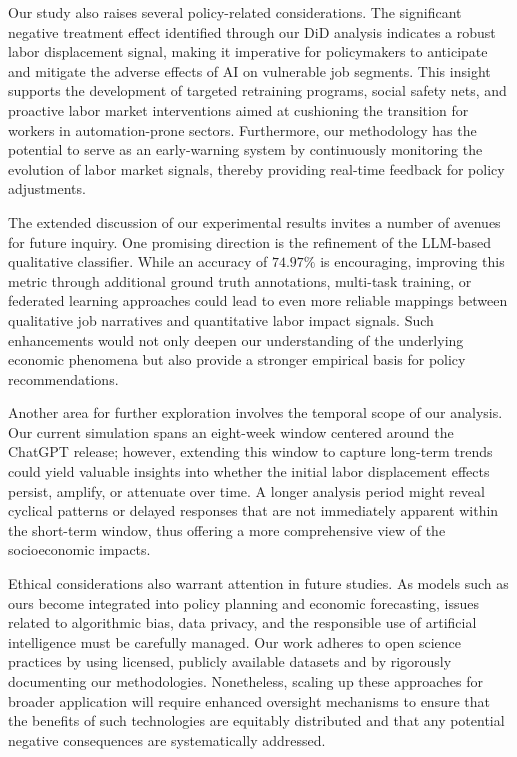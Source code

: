 \documentclass{article} %
\begin{document}
Our study also raises several policy-related considerations. The significant negative treatment effect identified through our DiD analysis indicates a robust labor displacement signal, making it imperative for policymakers to anticipate and mitigate the adverse effects of AI on vulnerable job segments. This insight supports the development of targeted retraining programs, social safety nets, and proactive labor market interventions aimed at cushioning the transition for workers in automation-prone sectors. Furthermore, our methodology has the potential to serve as an early-warning system by continuously monitoring the evolution of labor market signals, thereby providing real-time feedback for policy adjustments.

The extended discussion of our experimental results invites a number of avenues for future inquiry. One promising direction is the refinement of the LLM-based qualitative classifier. While an accuracy of \(74.97\%\) is encouraging, improving this metric through additional ground truth annotations, multi-task training, or federated learning approaches could lead to even more reliable mappings between qualitative job narratives and quantitative labor impact signals. Such enhancements would not only deepen our understanding of the underlying economic phenomena but also provide a stronger empirical basis for policy recommendations.

Another area for further exploration involves the temporal scope of our analysis. Our current simulation spans an eight-week window centered around the ChatGPT release; however, extending this window to capture long-term trends could yield valuable insights into whether the initial labor displacement effects persist, amplify, or attenuate over time. A longer analysis period might reveal cyclical patterns or delayed responses that are not immediately apparent within the short-term window, thus offering a more comprehensive view of the socioeconomic impacts.

Ethical considerations also warrant attention in future studies. As models such as ours become integrated into policy planning and economic forecasting, issues related to algorithmic bias, data privacy, and the responsible use of artificial intelligence must be carefully managed. Our work adheres to open science practices by using licensed, publicly available datasets and by rigorously documenting our methodologies. Nonetheless, scaling up these approaches for broader application will require enhanced oversight mechanisms to ensure that the benefits of such technologies are equitably distributed and that any potential negative consequences are systematically addressed.
\end{document}

